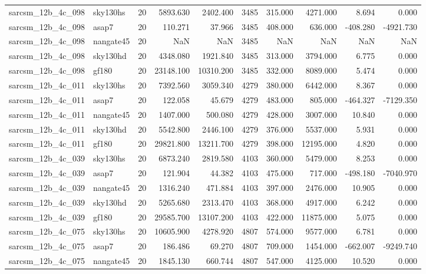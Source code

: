\begin{longtable}{llrrrrrrrr}
sarcsm\_12b\_4c\_098 & sky130hs & 20 & 5893.630 & 2402.400 & 3485 & 315.000 & 4271.000 & 8.694 & 0.000 \\
sarcsm\_12b\_4c\_098 & asap7 & 20 & 110.271 & 37.966 & 3485 & 408.000 & 636.000 & -408.280 & -4921.730 \\
sarcsm\_12b\_4c\_098 & nangate45 & 20 & NaN & NaN & 3485 & NaN & NaN & NaN & NaN \\
sarcsm\_12b\_4c\_098 & sky130hd & 20 & 4348.080 & 1921.840 & 3485 & 313.000 & 3794.000 & 6.775 & 0.000 \\
sarcsm\_12b\_4c\_098 & gf180 & 20 & 23148.100 & 10310.200 & 3485 & 332.000 & 8089.000 & 5.474 & 0.000 \\
sarcsm\_12b\_4c\_011 & sky130hs & 20 & 7392.560 & 3059.340 & 4279 & 380.000 & 6442.000 & 8.367 & 0.000 \\
sarcsm\_12b\_4c\_011 & asap7 & 20 & 122.058 & 45.679 & 4279 & 483.000 & 805.000 & -464.327 & -7129.350 \\
sarcsm\_12b\_4c\_011 & nangate45 & 20 & 1407.000 & 500.080 & 4279 & 428.000 & 3007.000 & 10.840 & 0.000 \\
sarcsm\_12b\_4c\_011 & sky130hd & 20 & 5542.800 & 2446.100 & 4279 & 376.000 & 5537.000 & 5.931 & 0.000 \\
sarcsm\_12b\_4c\_011 & gf180 & 20 & 29821.800 & 13211.700 & 4279 & 398.000 & 12195.000 & 4.820 & 0.000 \\
sarcsm\_12b\_4c\_039 & sky130hs & 20 & 6873.240 & 2819.580 & 4103 & 360.000 & 5479.000 & 8.253 & 0.000 \\
sarcsm\_12b\_4c\_039 & asap7 & 20 & 121.904 & 44.382 & 4103 & 475.000 & 717.000 & -498.180 & -7040.970 \\
sarcsm\_12b\_4c\_039 & nangate45 & 20 & 1316.240 & 471.884 & 4103 & 397.000 & 2476.000 & 10.905 & 0.000 \\
sarcsm\_12b\_4c\_039 & sky130hd & 20 & 5265.680 & 2313.470 & 4103 & 368.000 & 4917.000 & 6.242 & 0.000 \\
sarcsm\_12b\_4c\_039 & gf180 & 20 & 29585.700 & 13107.200 & 4103 & 422.000 & 11875.000 & 5.075 & 0.000 \\
sarcsm\_12b\_4c\_075 & sky130hs & 20 & 10605.900 & 4278.920 & 4807 & 574.000 & 9577.000 & 6.781 & 0.000 \\
sarcsm\_12b\_4c\_075 & asap7 & 20 & 186.486 & 69.270 & 4807 & 709.000 & 1454.000 & -662.007 & -9249.740 \\
sarcsm\_12b\_4c\_075 & nangate45 & 20 & 1845.130 & 660.744 & 4807 & 547.000 & 4125.000 & 10.520 & 0.000 \\

\end{longtable}
